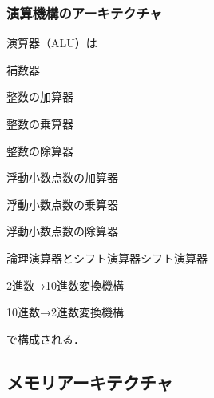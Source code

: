 \subsubsection{演算機構のアーキテクチャ}

演算器（ALU）は
\begin{enumerate}[label=\textbf{[\arabic*]}, labelsep=10pt, leftmargin=23pt]
	\item 補数器
	\item 整数の加算器
	\item 整数の乗算器
	\item 整数の除算器
	\item 浮動小数点数の加算器
	\item 浮動小数点数の乗算器
	\item 浮動小数点数の除算器
	\item 論理演算器とシフト演算器シフト演算器
	\item 2進数→10進数変換機構
	\item 10進数→2進数変換機構
\end{enumerate}
で構成される．



\subsection{メモリアーキテクチャ}